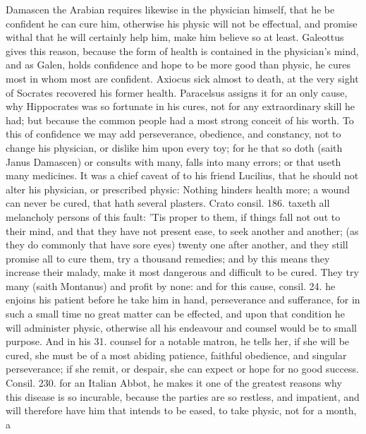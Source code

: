 {Damascen the Arabian requires likewise in the physician himself,
that he be confident he can cure him, otherwise his physic will not be
effectual, and promise withal that he will certainly help him, make him
believe so at least. Galeottus gives this reason, because the
form of health is contained in the physician's mind, and as Galen,
holds confidence and hope to be more good than physic, he cures
most in whom most are confident. Axiocus sick almost to death, at the
very sight of Socrates recovered his former health. Paracelsus assigns
it for an only cause, why Hippocrates was so fortunate in his cures,
not for any extraordinary skill he had; but because the common
people had a most strong conceit of his worth. To this of confidence we
may add perseverance, obedience, and constancy, not to change his
physician, or dislike him upon every toy; for he that so doth (saith
Janus Damascen) or consults with many, falls into many errors; or
that useth many medicines. It was a chief caveat of \Seneca to his
friend Lucilius, that he should not alter his physician, or prescribed
physic: Nothing hinders health more; a wound can never be cured, that
hath several plasters. Crato consil. 186. taxeth all melancholy persons
of this fault: 'Tis proper to them, if things fall not out to
their mind, and that they have not present ease, to seek another and
another; (as they do commonly that have sore eyes) twenty one after
another, and they still promise all to cure them, try a thousand
remedies; and by this means they increase their malady, make it most
dangerous and difficult to be cured. They try many (saith 
Montanus) and profit by none: and for this cause, consil. 24. he
enjoins his patient before he take him in hand, perseverance and
sufferance, for in such a small time no great matter can be effected,
and upon that condition he will administer physic, otherwise all his
endeavour and counsel would be to small purpose. And in his 31. counsel
for a notable matron, he tells her, if she will be cured, she
must be of a most abiding patience, faithful obedience, and singular
perseverance; if she remit, or despair, she can expect or hope for no
good success. Consil. 230. for an Italian Abbot, he makes it one of the
greatest reasons why this disease is so incurable, because the
parties are so restless, and impatient, and will therefore have him
that intends to be eased, to take physic, not for a month, a
}

